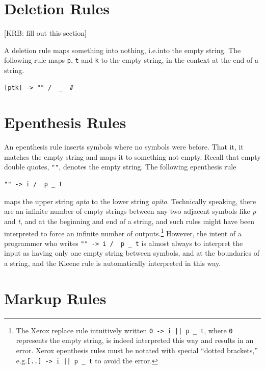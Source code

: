 \section{Deletion Rules}

[KRB:  fill out this section]

A deletion rule maps something into nothing, i.e.\@ into the empty string.  The
following rule maps \texttt{p}, \texttt{t} and \texttt{k} to the empty string, in
the context at the end of a string.


\begin{Verbatim}
[ptk] -> "" /  _  #
\end{Verbatim}


\section{Epenthesis Rules}

An epenthesis rule inserts symbols where no symbols were before.  That it, it matches the empty string and maps it to
something not empty.  Recall that empty double quotes, \verb!""!, denotes the empty string.  The following epenthesis rule

\begin{Verbatim}
"" -> i /  p _ t
\end{Verbatim}

\noindent
maps the upper string \emph{apto} to the lower string \emph{apito}.  Technically speaking, there are an infinite number
of empty strings between any two adjacent symbols like \emph{p} and \emph{t}, and at the beginning and end of a string, and such rules might have been interpreted to force
an infinite number of outputs.\footnote{The Xerox replace rule intuitively
	written \verb!0 -> i || p _ t!, where \verb!0! represents the empty
	string, is indeed interpreted this
way and results in an error.  Xerox epenthesis rules must be notated with special ``dotted brackets,'' 
e.g.\@ \verb![..] -> i || p _ t! to avoid the error.}  However, the intent of a programmer who writes \verb!"" -> i /  p _ t! is almost always to
interpret the input as having only one empty string between symbols, and at the boundaries of a string, and the Kleene rule is automatically interpreted in this way.


\section{Markup Rules}

\label{markupRules}

